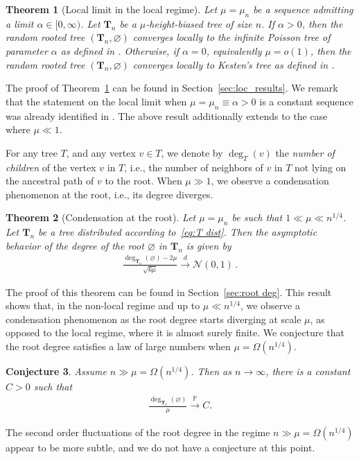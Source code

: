 \documentclass{article}
\newcommand{\1}{\mathbbm{1}}								%
\newtheorem{theorem}{Theorem}[section]
\newtheorem{conjecture}[theorem]{Conjecture}
\theoremstyle{definition}
\numberwithin{equation}{section}
\newcommand{\toindis}{\overset d\longrightarrow}
\newcommand{\toinp}{\overset{\mathbb P}{\longrightarrow}}
\begin{document}
\begin{theorem}[Local limit in the local regime]\label{thm:loclim}
Let $\mu=\mu_n$ be a sequence admitting a limit $\alpha \in [0,\infty)$.
Let $\mathbf{T}_n$ be a $\mu$-height-biased tree of size $n$. If $\alpha>0$, then the random rooted tree $(\mathbf{T}_{n},\varnothing)$ converges locally to the infinite \emph{Poisson tree} of parameter $\alpha$ as defined in \cite{abraham2020very}. Otherwise, if $\alpha=0$, equivalently $\mu=o(1)$, then the random rooted tree $(\mathbf{T}_{n},\varnothing)$ converges locally to Kesten's tree as defined in \cite{kesten1986subdiffusive}.
\end{theorem}
The proof of Theorem~\ref{thm:loclim} can be found in Section~\ref{sec:loc_results}.
We remark that the statement on the local limit when $\mu=\mu_n\equiv \alpha>0$ is a constant sequence was already identified in \cite[Theorem 4.3]{durhuus2023trees}. The above result additionally extends to the case where $\mu\ll 1$.

For any tree $T$, and any vertex $v \in T$, we denote by $\deg_T(v)$ the \emph{number of children} of the vertex $v$ in $T$, i.e., the number of neighbors of $v$ {in $T$} not lying on the ancestral path of $v$ to the root. When $\mu\gg1$, we observe a condensation phenomenon at the root, i.e., its degree diverges. 

\begin{theorem}[Condensation at the root]\label{thm:root deg}
    Let $\mu=\mu_n$ be such that $1\ll\mu\ll n^{1/4}$.
    Let $\mathbf{T}_n$ be a tree distributed according to~\eqref{eq:T dist}.
    Then the asymptotic behavior of the degree of the root $\varnothing$ in $\mathbf{T}_n$ is given by
    \begin{align*}
        \frac{\deg_{\mathbf{T}_n}(\varnothing)-2\mu}{\sqrt{6\mu}}\toindis\mathcal{N}(0,1)\,.
    \end{align*}
\end{theorem}
The proof of this theorem can be found in Section~\ref{sec:root deg}.
This result shows that, in the non-local regime and up to $\mu \ll n^{1/4}$, we observe a condensation phenomenon as the root degree starts diverging at scale $\mu$, as opposed to the local regime, where it is almost surely finite. We conjecture that the root degree satisfies a law of large numbers when $\mu=\Omega(n^{1/4})$.
\begin{conjecture}\label{conj:root degree}
 Assume $n\gg \mu =\Omega( n^{1/4})$. Then as $n \to \infty$, there is a constant $C>0$ such that
 \begin{align*}
     \frac{\deg_{\mathbf{T}_n}(\varnothing)}{\mu}\toinp C.
 \end{align*}
\end{conjecture}
The second order fluctuations of the root degree in the regime $n\gg \mu=\Omega( n^{1/4})$ appear to be more subtle, and we do not have a conjecture at this point.
\end{document}
